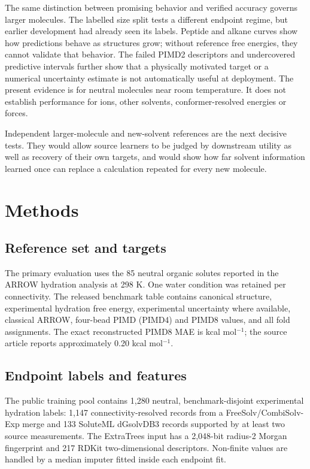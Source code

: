 \documentclass[12pt]{article}
\begin{document}
The same distinction between promising behavior and verified accuracy governs
larger molecules. The labelled size split tests a different endpoint regime,
but earlier development had already seen its labels. Peptide and alkane curves
show how predictions behave as structures grow; without reference free energies,
they cannot validate that behavior. The failed PIMD2 descriptors and undercovered
predictive intervals further show that a physically motivated target or a
numerical uncertainty estimate is not automatically useful at deployment. The
present evidence is for neutral molecules near room temperature. It does not
establish performance for ions, other solvents, conformer-resolved energies or
forces.

Independent larger-molecule and new-solvent references are the next decisive
tests. They would allow source learners to be judged by downstream utility
as well as recovery of their own targets, and would show how far solvent
information learned once can replace a calculation repeated for every new
molecule.

\FloatBarrier
\section*{Methods}

\subsection*{Reference set and targets}

The primary evaluation uses the 85 neutral organic solutes reported in the ARROW
hydration analysis at 298 K.\cite{arrow2022} One water condition was retained per
connectivity. The released benchmark table contains canonical structure,
experimental hydration free energy, experimental uncertainty where available,
classical ARROW, four-bead PIMD (PIMD4) and PIMD8 values, and all fold assignments. The exact
reconstructed PIMD8 MAE is \PIMDMAE{} kcal mol$^{-1}$; the source article reports
approximately 0.20 kcal mol$^{-1}$.

\subsection*{Endpoint labels and features}

The public training pool contains 1,280 neutral, benchmark-disjoint experimental
hydration labels: 1,147 connectivity-resolved records from a FreeSolv/CombiSolv-Exp
merge and 133 SoluteML dGsolvDB3 records supported by at least two source
measurements.\cite{freesolv2017,combisolv2021,soluteml2022} The ExtraTrees input has a
2,048-bit radius-2 Morgan fingerprint and 217 RDKit two-dimensional descriptors.
Non-finite values are handled by a median imputer fitted inside each endpoint fit.
\end{document}
